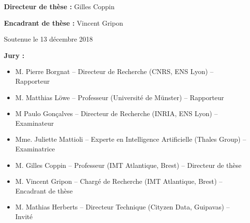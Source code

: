    \begin{center}
        \textbf{Directeur de thèse :} Gilles Coppin
    \end{center}
    \begin{center}
        \textbf{Encadrant de thèse :} Vincent Gripon
    \end{center}
    \begin{center}
        Soutenue le 13 décembre 2018
    \end{center}
    \vfill
    
    \textbf{Jury :}
    \begin{itemize}[label={}, labelsep=0cm, leftmargin=*, noitemsep]
        \item M. Pierre Borgnat -- Directeur de Recherche (CNRS, ENS Lyon) -- Rapporteur
        \item M. Matthias Löwe -- Professeur  (Université de Münster) -- Rapporteur
        \item M  Paulo Gonçalves -- Directeur de Recherche (INRIA, ENS Lyon) -- Examinateur
        \item Mme. Juliette Mattioli -- Experte en Intelligence Artificielle (Thales Group) -- Examinatrice
        \item M. Gilles Coppin -- Professeur (IMT Atlantique, Brest) -- Directeur de thèse
        \item M. Vincent Gripon -- Chargé de Recherche (IMT Atlantique, Brest) -- Encadrant de thèse
        \item M. Mathias Herberts -- Directeur Technique (Cityzen Data, Guipavas) -- Invité
    \end{itemize}
